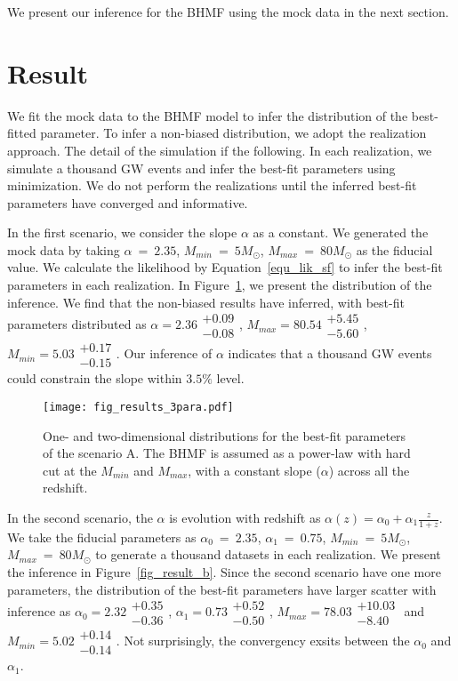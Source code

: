 \documentclass[twocolumn]{aastex62}
\begin{document}
 We present our inference for the BHMF using the mock data in the next section. 


\vspace{1cm}
\section{Result}\label{sec_result}
We fit the mock data to the BHMF model to infer the distribution of the best-fitted parameter. To infer a non-biased distribution, we adopt the realization approach. The detail of the simulation if the following. In each realization, we simulate a thousand GW events and infer the best-fit parameters using minimization. We do not perform the realizations until the inferred best-fit parameters have converged and informative. 

In the first scenario, we consider the slope $\alpha$ as a constant. We generated the mock data by taking $\alpha~=~2.35$, $M_{min}~=~5M_{\odot}$, $M_{max}~=~80M_{\odot}$ as the fiducial value. We calculate the likelihood by Equation~\ref{equ_lik_sf} to infer the best-fit parameters in each realization. In Figure~\ref{fig_result_a}, we present the distribution of the inference. We find that the non-biased results have inferred, with  best-fit parameters distributed as $\alpha = 2.36\substack{+0.09\\-0.08}$, $M_{max} = 80.54\substack{+5.45\\-5.60}$,  $M_{min} = 5.03\substack{+0.17\\-0.15}$. Our inference of $\alpha$ indicates that a thousand GW events could constrain the slope within $3.5\%$ level.

\begin{figure}%
\texttt{[image: fig\_results\_3para.pdf]}
\caption{
One- and two-dimensional distributions for the best-fit parameters of the scenario A. The BHMF is assumed as a power-law with hard cut at the $M_{min}$ and $M_{max}$, with a constant slope ($\alpha$) across all the redshift.
}
\label{fig_result_a}
\end{figure}

In the second scenario, the $\alpha$ is evolution with redshift as $\alpha(z) = \alpha_0 + \alpha_1\frac{z}{1+z}$. We take the fiducial parameters as $\alpha_0~=~2.35$, $\alpha_1~=~0.75$, $M_{min}~=~5M_{\odot}$, $M_{max}~=~80M_{\odot}$ to generate a thousand datasets in each realization. We present the inference in Figure~\ref{fig_result_b}. Since the second scenario have one more parameters, the distribution of the best-fit parameters have larger scatter with inference as $\alpha_0 = 2.32\substack{+0.35\\-0.36}$, $\alpha_1 = 0.73\substack{+0.52\\-0.50}$, $M_{max} = 78.03\substack{+10.03\\-8.40}$ and  $M_{min} = 5.02\substack{+0.14\\-0.14}$. Not surprisingly, the convergency exsits between the $\alpha_0$ and $\alpha_1$.
\end{document}
